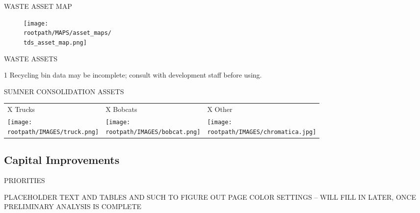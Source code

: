\pagebreak

\textcolor{ccorange}{WASTE ASSET MAP}
\begin{figure}[H]
\raggedright
\texttt{[image: \\rootpath/MAPS/asset\_maps/\\tds\_asset\_map.png]}
\end{figure}
\pagebreak

\textcolor{ccorange}{WASTE ASSETS}

\begin{table}[H]
\begin{threeparttable}
\small



\begin{tablenotes}
\item [1] Recycling bin data may be incomplete; consult with development staff before using.
\end{tablenotes}
\end{threeparttable}
\end{table}

\textcolor{ccorange}{SUMNER CONSOLIDATION ASSETS}
\begin{table}[H]
\begin{tabular}{m{}m{}m{}}
{\color{ccorange} X Trucks} & {\color{ccorange} X Bobcats} & {\color{ccorange} X Other} \\
\texttt{[image: \\rootpath/IMAGES/truck.png]}                            & \texttt{[image: \\rootpath/IMAGES/bobcat.png]}                             & \texttt{[image: \\rootpath/IMAGES/chromatica.jpg]}                          
\end{tabular}
\end{table}
\pagebreak
\textcolor{ccorange}{\section{Capital Improvements}}

\begin{table}[H]



\end{table}
\pagebreak

\textcolor{ccorange}{PRIORITIES}

PLACEHOLDER TEXT AND TABLES AND SUCH TO FIGURE OUT PAGE COLOR SETTINGS -- WILL FILL IN LATER, ONCE PRELIMINARY ANALYSIS IS COMPLETE
\pagebreak
\pagestyle{plain}
\pagecolor{ccfuschia}
\pagebreak
{}
\pagestyle{fancy}
\fancyhf{}
\renewcommand{\chaptermark}[1]{\markboth{#1}{}}
\fancyfoot[LE,RO]{\thepage}


